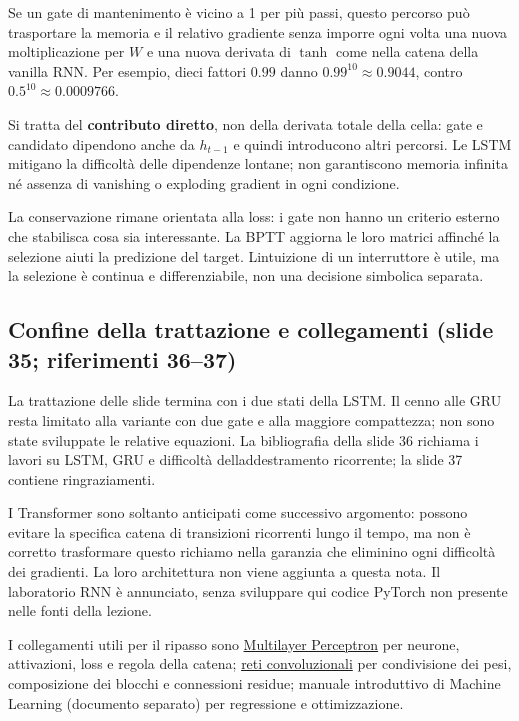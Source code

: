 \documentclass[11pt,a4paper,oneside,openany]{book}
\begin{document}
Se un gate di mantenimento è vicino a 1 per più passi, questo percorso può trasportare la memoria e il relativo gradiente senza imporre ogni volta una nuova moltiplicazione per \(W\) e una nuova derivata di \(\tanh\) come nella catena della vanilla RNN. Per esempio, dieci fattori \(0.99\) danno \(0.99^{10}\approx0.9044\), contro \(0.5^{10}\approx0.0009766\).

Si tratta del \textbf{contributo diretto}, non della derivata totale della cella: gate e candidato dipendono anche da \(h_{t-1}\) e quindi introducono altri percorsi. Le LSTM mitigano la difficoltà delle dipendenze lontane; non garantiscono memoria infinita né assenza di vanishing o exploding gradient in ogni condizione.

La conservazione rimane orientata alla loss: i gate non hanno un criterio esterno che stabilisca cosa sia interessante. La BPTT aggiorna le loro matrici affinché la selezione aiuti la predizione del target. L\textquotesingle intuizione di un interruttore è utile, ma la selezione è continua e differenziabile, non una decisione simbolica separata.

\subsection{Confine della trattazione e collegamenti (slide 35; riferimenti 36--37)}\label{f03-r866}

La trattazione delle slide termina con i due stati della LSTM. Il cenno alle GRU resta limitato alla variante con due gate e alla maggiore compattezza; non sono state sviluppate le relative equazioni. La bibliografia della slide 36 richiama i lavori su LSTM, GRU e difficoltà dell\textquotesingle addestramento ricorrente; la slide 37 contiene ringraziamenti.

I Transformer sono soltanto anticipati come successivo argomento: possono evitare la specifica catena di transizioni ricorrenti lungo il tempo, ma non è corretto trasformare questo richiamo nella garanzia che eliminino ogni difficoltà dei gradienti. La loro architettura non viene aggiunta a questa nota. Il laboratorio RNN è annunciato, senza sviluppare qui codice PyTorch non presente nelle fonti della lezione.

I collegamenti utili per il ripasso sono \hyperref[fonte01]{Multilayer Perceptron} per neurone, attivazioni, loss e regola della catena; \hyperref[fonte02]{reti convoluzionali} per condivisione dei pesi, composizione dei blocchi e connessioni residue; manuale introduttivo di Machine Learning (documento separato) per regressione e ottimizzazione.
\end{document}
